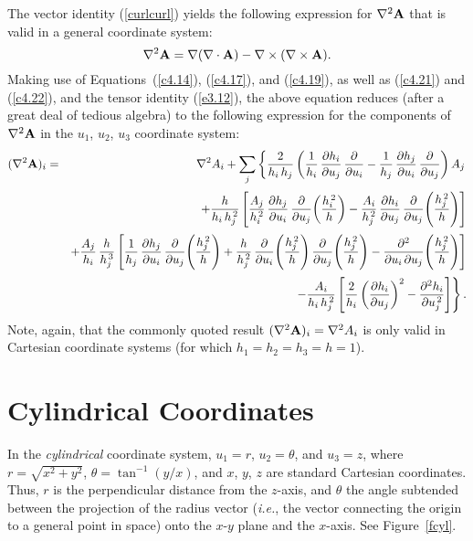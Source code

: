 The vector identity (\ref{curlcurl}) yields the
following expression for $\nabla^2{\bf A}$ that is valid in a general coordinate system:
\begin{equation}
\nabla^2{\bf A} = \nabla(\nabla\cdot{\bf A}) - \nabla\times(\nabla\times {\bf A}).
\end{equation}
Making use of Equations~(\ref{c4.14}), (\ref{c4.17}), and (\ref{c4.19}), as well
as (\ref{c4.21}) and (\ref{c4.22}), and the tensor identity (\ref{e3.12}),  the above equation reduces (after a great deal of
tedious algebra) to the following expression for the components of $\nabla^2{\bf A}$
in the $u_1$, $u_2$, $u_3$ coordinate system:
\begin{eqnarray}\label{c4.28}
(\nabla^2{\bf A})_i&=& \nabla^2 A_i +\sum_j\left\{\frac{2}{h_i\,h_j}\left(\frac{1}{h_i}\,\frac{\partial h_i}{\partial u_j}\,\frac{\partial}{\partial u_i}-
\frac{1}{h_j}\,\frac{\partial h_j}{\partial u_i}\,\frac{\partial}{\partial u_j}\right) A_j\right.\nonumber\\[0.5ex]
&&+\frac{h}{h_i\,h_j^{\,2}}\left[\frac{A_j}{h_i^{\,2}}\,\frac{\partial h_j}{\partial u_i}\,\frac{\partial}{\partial u_j}\!\left(
\frac{h_i^{\,2}}{h}\right)- \frac{A_i}{h_j^{\,2}}\,\frac{\partial h_i}{\partial u_j}\,\frac{\partial}{\partial u_j}\!\left(
\frac{h_j^{\,2}}{h}\right) \right]\nonumber\\[0.5ex]
&&+\frac{A_j}{h_i}\,\frac{h}{h_j^{\,3}}\left[\frac{1}{h_j}\,\frac{\partial h_j}{\partial u_i}\,\frac{\partial}{\partial u_j}\!\left(\frac{h_j^{\,2}}{h}\right)+\frac{h}{h_j^{\,2}}\,\frac{\partial}{\partial u_i}\!\left(\frac{h_j^{\,2}}{h}\right)\frac{\partial}{\partial u_j}\!\left(\frac{h_j^{\,2}}{h}\right)-\frac{\partial^2}{\partial u_i\,\partial u_j}\!\left(\frac{h_j^{\,2}}{h}\right)\right]\nonumber\\[0.5ex]
&&\left.-\frac{A_i}{h_i\,h_j^{\,2}}\left[\frac{2}{h_i}\left(\frac{\partial h_i}{\partial u_j}\right)^2-\frac{\partial^2 h_i}{\partial
u_j^{\,2}}\right]\right\}.
\end{eqnarray}
Note, again,  that the commonly quoted result $(\nabla^2 {\bf A})_i=\nabla^2 A_i$ is only valid in Cartesian coordinate systems (for which $h_1=h_2=h_3=h=1$). 

\section{Cylindrical Coordinates}\label{scyl}
In the {\em cylindrical}\/ coordinate system, $u_1=r$, $u_2=\theta$, and $u_3=z$, 
 where $r=\sqrt{x^2+y^2}$,  $\theta=\tan^{-1}(y/x)$, and $x$, $y$, $z$ are standard Cartesian coordinates. 
Thus, $r$ is the perpendicular distance from the $z$-axis, and $\theta$
the angle subtended between the projection of the radius vector ({\em i.e.}, the vector connecting the origin to
a general point in space) onto the $x$-$y$ plane and the $x$-axis. See
Figure~\ref{fcyl}.

